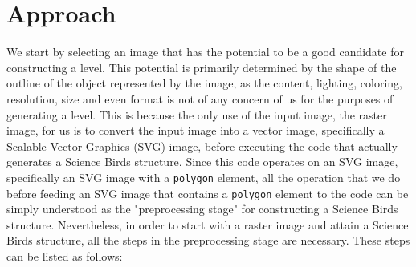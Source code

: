 \documentclass{dalthesis}
\begin{document}
\author{Utku Gultopu}
\mcs

\mainmatter

\chapter{Approach}

We start by selecting an image that has the potential to be a good candidate for constructing a level. This potential is primarily determined by the shape of the outline of the object represented by the image, as the content, lighting, coloring, resolution, size and even format is not of any concern of us for the purposes of generating a level. This is because the only use of the input image, the raster image, for us is to convert the input image into a vector image, specifically a Scalable Vector Graphics (SVG) image, before executing the code that actually generates a Science Birds structure. Since this code operates on an SVG image, specifically an SVG image with a \lstinline{polygon} element, all the operation that we do before feeding an SVG image that contains a \lstinline{polygon} element to the code can be simply understood as the "preprocessing stage" for constructing a Science Birds structure. Nevertheless, in order to start with a raster image and attain a Science Birds structure, all the steps in the preprocessing stage are necessary. These steps can be listed as follows:
\end{document}
